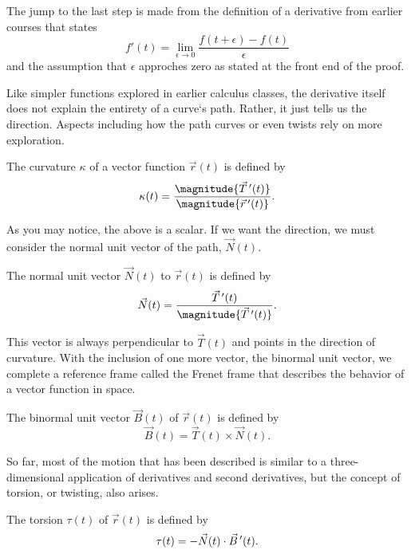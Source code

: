 \begin{remark}
    The jump to the last step is made from the definition of a derivative from earlier courses that states
    \[f'(t) = \lim_{\epsilon \to 0} \frac{f(t + \epsilon) - f(t)}{\epsilon}\]
    and the assumption that $\epsilon$ approches zero as stated at the front end of the proof.
\end{remark}

Like simpler functions explored in earlier calculus classes, the derivative itself does not explain the entirety of a curve`s path. Rather, it just tells us the direction. Aspects including how the path curves or even twists rely on more exploration.

\begin{proposition}
    The curvature $\kappa$ of a vector function $\vec{r}(t)$ is defined by
    \[\kappa(t) = \frac{\magnitude{\ddvec{T}(t)}}{\magnitude{\ddvec{r}(t)}}.\]
\end{proposition}

As you may notice, the above is a scalar. If we want the direction, we must consider the normal unit vector of the path, $\vec{N}(t)$.

\begin{proposition}
    The normal unit vector $\vec{N}(t)$ to $\vec{r}(t)$ is defined by
    \[\vec{N}(t) = \frac{\ddvec{T}(t)}{\magnitude{\ddvec{T}(t)}}.\]
\end{proposition}

This vector is always perpendicular to $\vec{T}(t)$ and points in the direction of curvature. With the inclusion of one more vector, the binormal unit vector, we complete a reference frame called the Frenet frame that describes the behavior of a vector function in space.

\begin{proposition}
    The binormal unit vector $\vec{B}(t)$ of $\vec{r}(t)$ is defined by
    \[\vec{B}(t) = \vec{T}(t) \times \vec{N}(t).\]
\end{proposition}

So far, most of the motion that has been described is similar to a three-dimensional application of derivatives and second derivatives, but the concept of torsion, or twisting, also arises.

\begin{proposition}
    The torsion $\tau(t)$ of $\vec{r}(t)$ is defined by
    \[\tau(t) = -\vec{N}(t) \cdot \vec{B}\,^{\prime}(t).\]
\end{proposition}